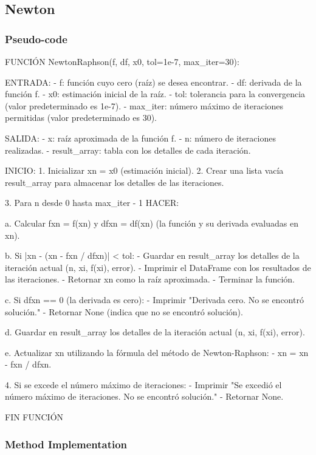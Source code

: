 \documentclass{article}
\begin{document}
    \subsection{Newton}
        \subsubsection{Pseudo-code}
        FUNCIÓN NewtonRaphson(f, df, x0, tol=1e-7, max_iter=30):

    ENTRADA:
    - f: función cuyo cero (raíz) se desea encontrar.
    - df: derivada de la función f.
    - x0: estimación inicial de la raíz.
    - tol: tolerancia para la convergencia (valor predeterminado es 1e-7).
    - max_iter: número máximo de iteraciones permitidas (valor predeterminado es 30).

    SALIDA:
    - x: raíz aproximada de la función f.
    - n: número de iteraciones realizadas.
    - result_array: tabla con los detalles de cada iteración.

    INICIO:
    1. Inicializar xn = x0 (estimación inicial).
    2. Crear una lista vacía result_array para almacenar los detalles de las iteraciones.

    3. Para n desde 0 hasta max_iter - 1 HACER:

        a. Calcular fxn = f(xn) y dfxn = df(xn) (la función y su derivada evaluadas en xn).

        b. Si |xn - (xn - fxn / dfxn)| < tol:
           - Guardar en result_array los detalles de la iteración actual (n, xi, f(xi), error).
           - Imprimir el DataFrame con los resultados de las iteraciones.
           - Retornar xn como la raíz aproximada.
           - Terminar la función.

        c. Si dfxn == 0 (la derivada es cero):
           - Imprimir "Derivada cero. No se encontró solución."
           - Retornar None (indica que no se encontró solución).

        d. Guardar en result_array los detalles de la iteración actual (n, xi, f(xi), error).

        e. Actualizar xn utilizando la fórmula del método de Newton-Raphson:
           - xn = xn - fxn / dfxn.

    4. Si se excede el número máximo de iteraciones:
       - Imprimir "Se excedió el número máximo de iteraciones. No se encontró solución."
       - Retornar None.

FIN FUNCIÓN

        \subsubsection{Method Implementation}
\end{document}
